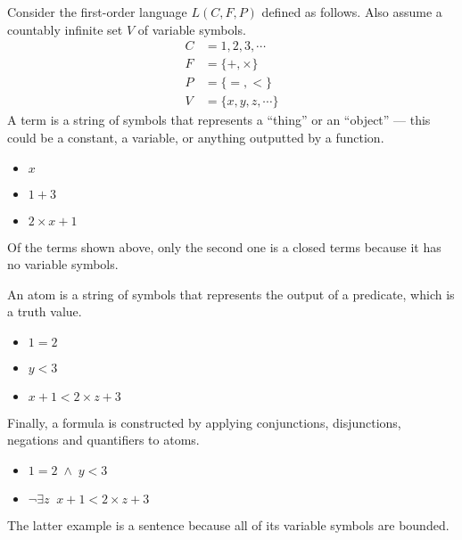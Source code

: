 Consider the first-order language \(L(C, F, P)\) defined as follows. Also assume a countably infinite set \(V\) of variable symbols.
%
\begin{align*}
    C &= 1, 2, 3, \cdots \tag{constant symbols}\\
    F &= \{+, \times\} \tag{function symbols, both binary}\\
    P &= \{=, <\} \tag{predicate symbols, both binary}\\
    V &= \{x, y, z, \cdots\} \tag{variable symbols}
\end{align*}
%
A term is a string of symbols that represents a ``thing'' or an ``object'' --- this could be a constant, a variable, or anything outputted by a function.
%
\begin{itemize}
    \item \(x\)
    \item \(1 + 3\)
    \item \(2 \times x + 1\)
\end{itemize}
%
Of the terms shown above, only the second one is a closed terms because it has no variable symbols.

An atom is a string of symbols that represents the output of a predicate, which is a truth value.
%
\begin{itemize}
    \item \(1 = 2\)
    \item \(y < 3\)
    \item \(x + 1 < 2 \times z + 3\)
\end{itemize}
%
Finally, a formula is constructed by applying conjunctions, disjunctions, negations and quantifiers to atoms.
%
\begin{itemize}
    \item \(1 = 2 \;\land\; y < 3\)
    \item \(\neg \exists z\;\; x + 1 < 2 \times z + 3\)
\end{itemize}
%
The latter example is a sentence because all of its variable symbols are bounded.


